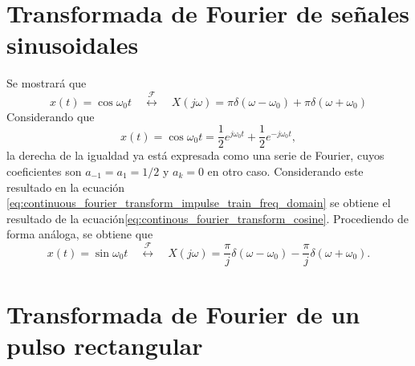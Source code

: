\documentclass[a4paper]{report}
\begin{document}
\section{Transformada de Fourier de señales sinusoidales}

Se mostrará que 
\begin{equation}\label{eq:continous_fourier_transform_cosine}
 x(t)=\cos\omega_0t
 \quad\overset{\mathcal{F}}{\longleftrightarrow}\quad
 X(j\omega)=\pi\delta\left(\omega-\omega_0\right)+\pi\delta\left(\omega+\omega_0\right)
\end{equation}
Considerando que 
\[
 x(t)=\cos\omega_0t=\frac{1}{2}e^{j\omega_0t}+\frac{1}{2}e^{-j\omega_0t},
\]
la derecha de la igualdad ya está expresada como una serie de Fourier, cuyos coeficientes son \(a_{-1}=a_1=1/2\) y \(a_k=0\) en otro caso. Considerando este resultado en la ecuación \ref{eq:continuous_fourier_transform_impulse_train_freq_domain} se obtiene el resultado de la ecuación\ref{eq:continous_fourier_transform_cosine}. Procediendo de forma análoga, se obtiene que
\begin{equation}\label{eq:continous_fourier_transform_sine}
 x(t)=\sin\omega_0t
 \quad\overset{\mathcal{F}}{\longleftrightarrow}\quad
 X(j\omega)=\frac{\pi}{j}\delta\left(\omega-\omega_0\right)-\frac{\pi}{j}\delta\left(\omega+\omega_0\right).
\end{equation}

\section{Transformada de Fourier de un pulso rectangular}
 
\end{document}
